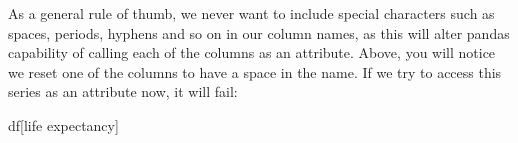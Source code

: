 \documentclass[
  letterpaper,
  DIV=11,
  numbers=noendperiod]{scrreprt}
\newenvironment{Shaded}{\begin{snugshade}}{\end{snugshade}}
\newcommand{\NormalTok}[1]{\textcolor[rgb]{0.00,0.23,0.31}{#1}}
\newcommand{\StringTok}[1]{\textcolor[rgb]{0.13,0.47,0.30}{#1}}
\begin{document}
\begin{tcolorbox}[enhanced jigsaw, rightrule=.15mm, opacitybacktitle=0.6, colback=white, toprule=.15mm, colframe=quarto-callout-tip-color-frame, bottomtitle=1mm, bottomrule=.15mm, arc=.35mm, coltitle=black, breakable, title=\textcolor{quarto-callout-tip-color}{\faLightbulb}\hspace{0.5em}{No Spaces!}, titlerule=0mm, opacityback=0, colbacktitle=quarto-callout-tip-color!10!white, left=2mm, toptitle=1mm, leftrule=.75mm]

As a general rule of thumb, we never want to include special characters
such as spaces, periods, hyphens and so on in our column names, as this
will alter pandas capability of calling each of the columns as an
attribute. Above, you will notice we reset one of the columns to have a
space in the name. If we try to access this series as an attribute now,
it will fail:

\begin{Shaded}
\begin{Highlighting}[]
\NormalTok{df[}\StringTok{\textquotesingle{}life expectancy\textquotesingle{}}\NormalTok{]}
\end{Highlighting}
\end{Shaded}


\end{tcolorbox}
\end{document}
